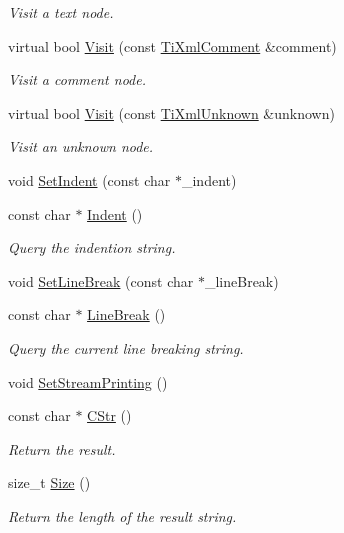 \begin{DoxyCompactItemize}
\begin{DoxyCompactList}\small\item\em Visit a text node. \end{DoxyCompactList}\item 
virtual bool \hyperlink{class_ti_xml_printer_a9870423f5603630e6142f6bdb66dfb57}{Visit} (const \hyperlink{class_ti_xml_comment}{Ti\+Xml\+Comment} \&comment)
\begin{DoxyCompactList}\small\item\em Visit a comment node. \end{DoxyCompactList}\item 
virtual bool \hyperlink{class_ti_xml_printer_a08591a15c9a07afa83c24e08b03d6358}{Visit} (const \hyperlink{class_ti_xml_unknown}{Ti\+Xml\+Unknown} \&unknown)
\begin{DoxyCompactList}\small\item\em Visit an unknown node. \end{DoxyCompactList}\item 
void \hyperlink{class_ti_xml_printer_a213377a4070c7e625bae59716b089e5e}{Set\+Indent} (const char $\ast$\+\_\+indent)
\item 
const char $\ast$ \hyperlink{class_ti_xml_printer_abb33ec7d4bad6aaeb57f4304394b133d}{Indent} ()
\begin{DoxyCompactList}\small\item\em Query the indention string. \end{DoxyCompactList}\item 
void \hyperlink{class_ti_xml_printer_a4be1e37e69e3858c59635aa947174fe6}{Set\+Line\+Break} (const char $\ast$\+\_\+line\+Break)
\item 
const char $\ast$ \hyperlink{class_ti_xml_printer_a11f1b4804a460b175ec244eb5724d96d}{Line\+Break} ()
\begin{DoxyCompactList}\small\item\em Query the current line breaking string. \end{DoxyCompactList}\item 
void \hyperlink{class_ti_xml_printer_ab23a90629e374cb1cadca090468bbd19}{Set\+Stream\+Printing} ()
\item 
const char $\ast$ \hyperlink{class_ti_xml_printer_a859eede9597d3e0355b77757be48735e}{C\+Str} ()
\begin{DoxyCompactList}\small\item\em Return the result. \end{DoxyCompactList}\item 
size\+\_\+t \hyperlink{class_ti_xml_printer_ad01375ae9199bd2f48252eaddce3039d}{Size} ()
\begin{DoxyCompactList}\small\item\em Return the length of the result string. \end{DoxyCompactList}\end{DoxyCompactItemize}


